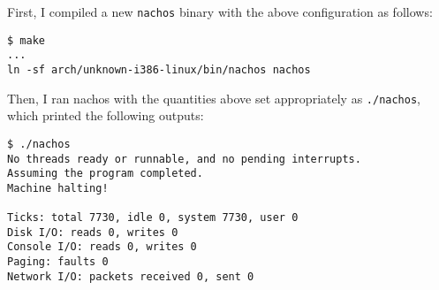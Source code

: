 \documentclass[11pt]{article}
\begin{document}
\begin{question}
\begin{subquestion}
        First, I compiled a new {\tt nachos} binary with the above configuration as follows:

        \begin{verbatim}
$ make
...
ln -sf arch/unknown-i386-linux/bin/nachos nachos
        \end{verbatim}

        Then, I ran nachos with the quantities above set appropriately as {\tt ./nachos}, which printed the following outputs:
        \begin{verbatim}
$ ./nachos
No threads ready or runnable, and no pending interrupts.
Assuming the program completed.
Machine halting!

Ticks: total 7730, idle 0, system 7730, user 0
Disk I/O: reads 0, writes 0
Console I/O: reads 0, writes 0
Paging: faults 0
Network I/O: packets received 0, sent 0


\end{verbatim}
\end{subquestion}
\end{question}
\end{document}
